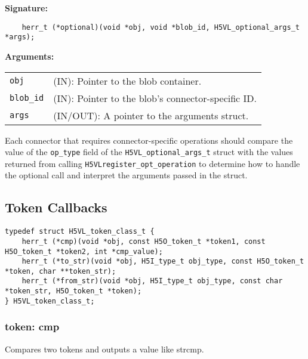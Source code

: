 \begin{mdframed}[style=bgbox]
\textbf{Signature:}
\begin{lstlisting}
    herr_t (*optional)(void *obj, void *blob_id, H5VL_optional_args_t *args);             
\end{lstlisting}

\textbf{Arguments:}\\
\begin{tabular}{l p{13.5cm}}
  \texttt{obj} & (IN): Pointer to the blob container.\\
  \texttt{blob\_id} & (IN): Pointer to the blob's connector-specific ID.\\
  \texttt{args} & (IN/OUT): A pointer to the arguments struct.\\
\end{tabular}
\end{mdframed}

Each connector that requires connector-specific operations should compare the
value of the {\tt op\_type} field of the {\tt H5VL\_optional\_args\_t} struct
with the values returned from calling {\tt H5VLregister\_opt\_operation} to
determine how to handle the optional call and interpret the arguments passed
in the struct.



\subsection{Token Callbacks}

\begin{lstlisting}[caption={Structure for token callback routines, H5VLconnector.h}, captionpos=b, label={lst:Tokenclass}]
typedef struct H5VL_token_class_t { 
    herr_t (*cmp)(void *obj, const H5O_token_t *token1, const H5O_token_t *token2, int *cmp_value);
    herr_t (*to_str)(void *obj, H5I_type_t obj_type, const H5O_token_t *token, char **token_str);
    herr_t (*from_str)(void *obj, H5I_type_t obj_type, const char *token_str, H5O_token_t *token);
} H5VL_token_class_t;
\end{lstlisting}

\subsubsection{token: cmp}
Compares two tokens and outputs a value like strcmp.


